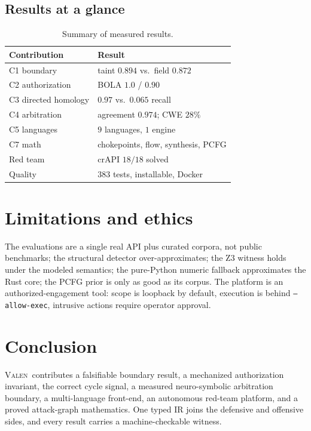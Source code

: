 \documentclass[journal]{IEEEtran}
\newcommand{\valen}{\textsc{Valen}}
\begin{document}
\subsection{Results at a glance}
\begin{table}[!t]
\centering\small
\begin{tabular}{@{}ll@{}}
\toprule
\textbf{Contribution} & \textbf{Result} \\
\midrule
C1 boundary & taint $0.894$ vs.\ field $0.872$ \\
C2 authorization & BOLA $1.0$ / $0.90$ \\
C3 directed homology & $0.97$ vs.\ $0.065$ recall \\
C4 arbitration & agreement $0.974$; CWE $28\%$ \\
C5 languages & $9$ languages, $1$ engine \\
C7 math & chokepoints, flow, synthesis, PCFG \\
Red team & crAPI $18/18$ solved \\
Quality & $383$ tests, installable, Docker \\
\bottomrule
\end{tabular}
\caption{Summary of measured results.}
\label{tab:results}
\end{table}

\section{Limitations and ethics}
The evaluations are a single real API plus curated corpora, not public benchmarks;
the structural detector over-approximates; the Z3 witness holds under the modeled
semantics; the pure-Python numeric fallback approximates the Rust core; the PCFG
prior is only as good as its corpus. The platform is an authorized-engagement
tool: scope is loopback by default, execution is behind \texttt{--allow-exec},
intrusive actions require operator approval.

\section{Conclusion}
\valen\ contributes a falsifiable boundary result, a mechanized authorization
invariant, the correct cycle signal, a measured neuro-symbolic arbitration
boundary, a multi-language front-end, an autonomous red-team platform, and a
proved attack-graph mathematics. One typed IR joins the defensive and offensive
sides, and every result carries a machine-checkable witness.
\end{document}

